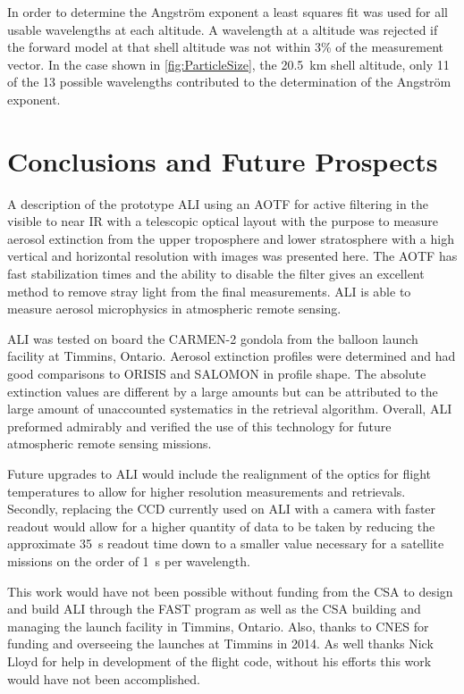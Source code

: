 \documentclass[12pt]{article}
\begin{document}
In order to determine the Angstr\"{o}m exponent a least squares fit was used for all usable wavelengths at each altitude. A wavelength at a altitude was rejected if the forward model at that shell altitude was not within 3\% of the measurement vector. In the case shown in \autoref{fig:ParticleSize}, the 20.5~km shell altitude, only 11 of the 13 possible wavelengths contributed to the determination of the Angstr\"{o}m exponent.

\section{Conclusions and Future Prospects}

A description of the prototype ALI using an AOTF for active filtering in the visible to near IR with a telescopic optical layout with the purpose to measure aerosol extinction from the upper troposphere and lower stratosphere with a high vertical and horizontal resolution with images was presented here. The AOTF has fast stabilization times and the ability to disable the filter gives an excellent method to remove stray light from the final measurements. ALI is able to measure aerosol microphysics in atmospheric remote sensing.

ALI was tested on board the CARMEN-2 gondola from the balloon launch facility at Timmins, Ontario. Aerosol extinction profiles were determined and had good comparisons to ORISIS and SALOMON in profile shape. The absolute extinction values are different by a large amounts but can be attributed to the large amount of unaccounted systematics in the retrieval algorithm. Overall, ALI preformed admirably and verified the use of this technology for future atmospheric remote sensing missions.

Future upgrades to ALI would include the realignment of the optics for flight temperatures to allow for higher resolution measurements and retrievals. Secondly, replacing the CCD currently used on ALI with a camera with faster readout would allow for a higher quantity of data to be taken by reducing the approximate 35~s readout time down to a smaller value necessary for a satellite missions on the order of 1~s per wavelength.

This work would have not been possible without funding from the CSA to design and build ALI through the FAST program as well as the CSA building and managing the launch facility in Timmins, Ontario. Also, thanks to CNES for funding and overseeing the launches at Timmins in 2014. As well thanks Nick Lloyd for help in development of the flight code, without his efforts this work would have not been accomplished.
\end{document}
